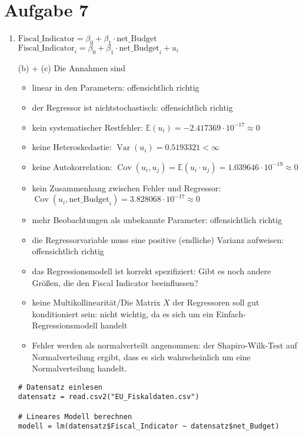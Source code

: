 \documentclass{article}
\newcommand{\E}{\mathbb{E}}
\DeclareMathOperator{\Var}{Var}
\DeclareMathOperator{\Cov}{Cov}
\begin{document}
	\section*{Aufgabe 7}
	\begin{enumerate}[label=(\alph*)]
		\item $\text{Fiscal\_Indicator} = \beta_0 + \beta_1\cdot\text{net\_Budget}$ \\
		$\text{Fiscal\_Indicator}_i = \beta_0 + \beta_1\cdot\text{net\_Budget}_i + u_i$ \\
		\item[(b) + (c)] Die Annahmen sind
		\begin{itemize}
			\item linear in den Parametern: offensichtlich richtig
			\item der Regressor ist nichtstochastisch: offensichtlich richtig
			\item kein systematischer Restfehler: $\E(u_i) = -2.417369\cdot 10^{-17} \approx 0$
			\item keine Heteroskedastie: $\Var(u_i) = 0.5193321 < \infty$
			\item keine Autokorrelation: $\Cov(u_i,u_j) = \E(u_i\cdot u_j) = 1.039646\cdot 10^{-19} \approx 0$
			\item kein Zusammenhang zwischen Fehler und Regressor: $\Cov(u_i,\text{net\_Budget}_i) = 3.828068\cdot 10^{-17} \approx 0$
			\item mehr Beobachtungen als unbekannte Parameter: offensichtlich richtig
			\item die Regressorvariable muss eine positive (endliche) Varianz aufweisen: offensichtlich richtig
			\item das Regressionsmodell ist korrekt spezifiziert: Gibt es noch andere Größen, die den Fiscal Indicator beeinflussen?
			\item keine Multikollinearität/Die Matrix $X$ der Regressoren soll gut konditioniert sein: nicht wichtig, da es sich um ein Einfach-Regressionsmodell handelt
			\item Fehler werden als normalverteilt angenommen: der Shapiro-Wilk-Test auf Normalverteilung ergibt, dass es sich wahrscheinlich um eine Normalverteilung handelt.
		\end{itemize}
		\begin{lstlisting}[style=R]
# Datensatz einlesen
datensatz = read.csv2("EU_Fiskaldaten.csv")

# Lineares Modell berechnen
modell = lm(datensatz$Fiscal_Indicator ~ datensatz$net_Budget)


\end{lstlisting}
\end{enumerate}
\end{document}
